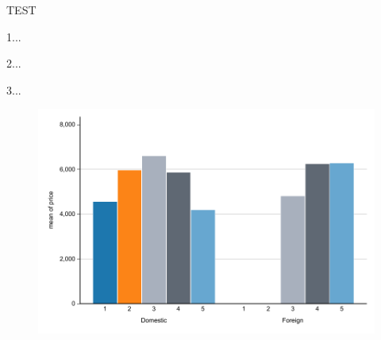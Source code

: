 \documentclass{beamer}
\begin{document}
    \begin{frame}
    TEST 

    1...

    2...

    3...
        \begin{figure}
            \centering
            \includegraphics[width=0.75\linewidth]{simple_figure/figure1.pdf}
        \end{figure}
    
    \end{frame}
\end{document}
